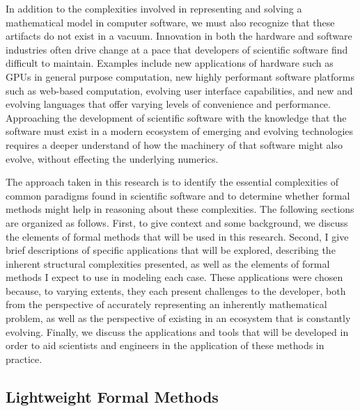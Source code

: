 \documentclass[../../proposal.tex]{subfiles}
\begin{document}
In addition to the complexities involved in representing and solving a mathematical model in computer software, we must also recognize that these artifacts do not exist in a vacuum.  Innovation in both the hardware and software industries often drive change at a pace that developers of scientific software find difficult to maintain.  Examples include new applications of hardware such as GPUs in general purpose computation, new highly performant software platforms such as web-based computation, evolving user interface capabilities, and new and evolving languages that offer varying levels of convenience and performance.  Approaching the development of scientific software with the knowledge that the software must exist in a modern ecosystem of emerging and evolving technologies requires a deeper understand of how the machinery of that software might also evolve, without effecting the underlying numerics.

The approach taken in this research is to identify the essential complexities of common paradigms found in scientific software and to determine whether formal methods might help in reasoning about these complexities.  The following sections are organized as follows.  First, to give context and some background, we discuss the elements of formal methods that will be used in this research.  Second, I give brief descriptions of specific applications that will be explored, describing the inherent structural complexities presented, as well as the elements of formal methods I expect to use in modeling each case.  These applications were chosen because, to varying extents, they each present challenges to the developer, both from the perspective of accurately representing an inherently mathematical problem, as well as the perspective of existing in an ecosystem that is constantly evolving.  Finally, we discuss the applications and tools that will be developed in order to aid scientists and engineers in the application of these methods in practice.

\subsection{Lightweight Formal Methods}
\end{document}
